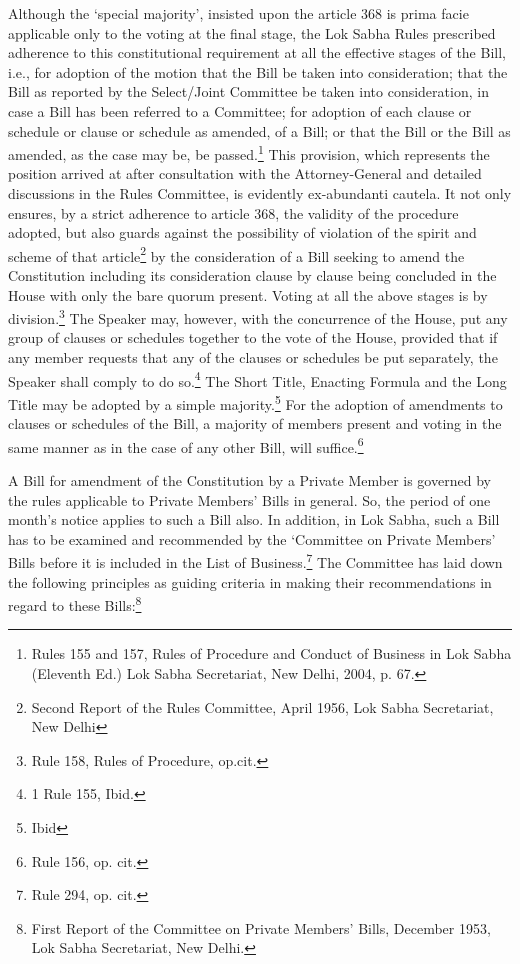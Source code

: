 \begin{multicols}{2}
\noi
Although the ‘special majority’, insisted upon the article 368 is prima facie applicable only to
the voting at the final stage, the Lok Sabha Rules prescribed adherence to this constitutional
requirement at all the effective stages of the Bill, i.e., for adoption of the motion that the Bill
be taken into consideration; that the Bill as reported by the Select/Joint Committee be taken 
into consideration, in case a Bill has been referred to a Committee; for adoption of each clause
or schedule or clause or schedule as amended, of a Bill; or that the Bill or the Bill as amended,
as the case may be, be passed.\footnote{Rules 155 and 157, Rules of Procedure and Conduct of Business in Lok Sabha (Eleventh Ed.) Lok Sabha Secretariat, New Delhi, 2004, p. 67.} This provision, which represents the position arrived at after
consultation with the Attorney-General and detailed discussions in the Rules Committee, is
evidently ex-abundanti cautela. It not only ensures, by a strict adherence to article 368, the
validity of the procedure adopted, but also guards against the possibility of violation of the
spirit and scheme of that article\footnote{Second Report of the Rules Committee, April 1956, Lok Sabha Secretariat, New Delhi} by the consideration of a Bill seeking to amend the Constitution including its consideration clause by clause being concluded in the House with only the bare quorum present. Voting at all the above stages is by division.\footnote{Rule 158, Rules of Procedure, op.cit.} The Speaker
may, however, with the concurrence of the House, put any group of clauses or schedules
together to the vote of the House, provided that if any member requests that any of the clauses
or schedules be put separately, the Speaker shall comply to do so.\footnote{1 Rule 155, Ibid.} The Short Title, Enacting
Formula and the Long Title may be adopted by a simple majority.\footnote{Ibid} For the adoption of
amendments to clauses or schedules of the Bill, a majority of members present and voting in
the same manner as in the case of any other Bill, will suffice.\footnote{Rule 156, op. cit.}

\noi
A Bill for amendment of the Constitution by a Private Member is governed by the rules
applicable to Private Members’ Bills in general. So, the period of one month’s notice applies
to such a Bill also. In addition, in Lok Sabha, such a Bill has to be examined and recommended
by the ‘Committee on Private Members’ Bills before it is included in the List of Business.\footnote{Rule 294, op. cit.}
The Committee has laid down the following principles as guiding criteria in making their
recommendations in regard to these Bills:\footnote{First Report of the Committee on Private Members’ Bills, December 1953, Lok Sabha Secretariat, New Delhi.}


\end{multicols}
